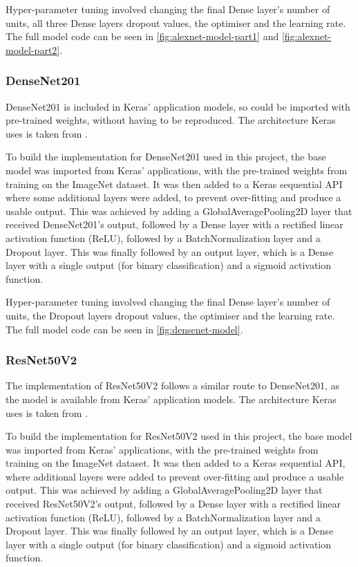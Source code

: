 Hyper-parameter tuning involved changing the final Dense layer's number of units, all three Dense layers dropout values, the optimiser and the learning rate. The full model code can be seen in \autoref{fig:alexnet-model-part1} and \autoref{fig:alexnet-model-part2}.

\subsubsection{DenseNet201}
DenseNet201 is included in Keras' application models, so could be imported with pre-trained weights, without having to be reproduced. The architecture Keras uses is taken from \cite{huang2017densely}.

To build the implementation for DenseNet201 used in this project, the base model was imported from Keras' applications, with the pre-trained weights from training on the ImageNet dataset. It was then added to a Keras sequential API where some additional layers were added, to prevent over-fitting and produce a usable output. This was achieved by adding a GlobalAveragePooling2D layer that received DenseNet201's output, followed by a Dense layer with a rectified linear activation function (ReLU), followed by a BatchNormalization layer and a Dropout layer. This was finally followed by an output layer, which is a Dense layer with a single output (for binary classification) and a sigmoid activation function.

Hyper-parameter tuning involved changing the final Dense layer's number of units, the Dropout layers dropout values, the optimiser and the learning rate. The full model code can be seen in \autoref{fig:densenet-model}.

\subsubsection{ResNet50V2}
The implementation of ResNet50V2 follows a similar route to DenseNet201, as the model is available from Keras' application models. The architecture Keras uses is taken from \cite{he2016identity}.

To build the implementation for ResNet50V2 used in this project, the base model was imported from Keras' applications, with the pre-trained weights from training on the ImageNet dataset. It was then added to a Keras sequential API, where additional layers were added to prevent over-fitting and produce a usable output. This was achieved by adding a GlobalAveragePooling2D layer that received ResNet50V2's output, followed by a Dense layer with a rectified linear activation function (ReLU), followed by a BatchNormalization layer and a Dropout layer. This was finally followed by an output layer, which is a Dense layer with a single output (for binary classification) and a sigmoid activation function.

